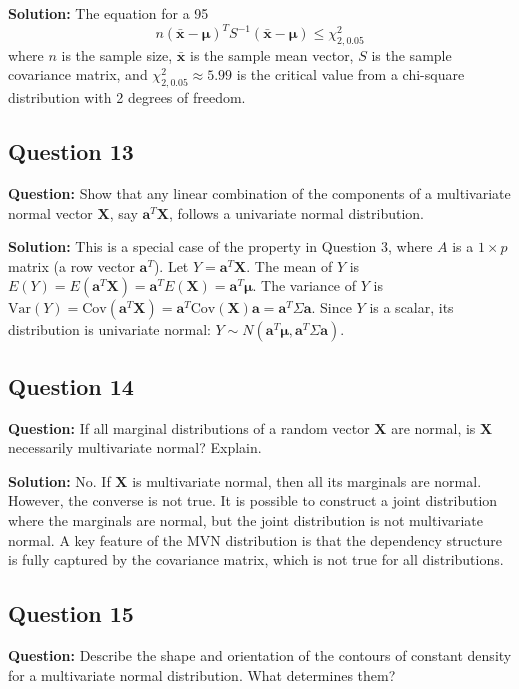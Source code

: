 \textbf{Solution:}
The equation for a 95%
$$ n(\bar{\mathbf{x}} - \boldsymbol{\mu})^T S^{-1} (\bar{\mathbf{x}} - \boldsymbol{\mu}) \le \chi^2_{2, 0.05} $$
where $n$ is the sample size, $\bar{\mathbf{x}}$ is the sample mean vector, $S$ is the sample covariance matrix, and $\chi^2_{2, 0.05} \approx 5.99$ is the critical value from a chi-square distribution with 2 degrees of freedom.

\subsection*{Question 13}
\textbf{Question:} Show that any linear combination of the components of a multivariate normal vector $\mathbf{X}$, say $\mathbf{a}^T\mathbf{X}$, follows a univariate normal distribution.

\textbf{Solution:}
This is a special case of the property in Question 3, where $A$ is a $1 \times p$ matrix (a row vector $\mathbf{a}^T$).
Let $Y = \mathbf{a}^T\mathbf{X}$. The mean of $Y$ is $E(Y) = E(\mathbf{a}^T\mathbf{X}) = \mathbf{a}^T E(\mathbf{X}) = \mathbf{a}^T\boldsymbol{\mu}$.
The variance of $Y$ is $\text{Var}(Y) = \text{Cov}(\mathbf{a}^T\mathbf{X}) = \mathbf{a}^T \text{Cov}(\mathbf{X}) \mathbf{a} = \mathbf{a}^T\Sigma\mathbf{a}$.
Since $Y$ is a scalar, its distribution is univariate normal: $Y \sim N(\mathbf{a}^T\boldsymbol{\mu}, \mathbf{a}^T\Sigma\mathbf{a})$.

\subsection*{Question 14}
\textbf{Question:} If all marginal distributions of a random vector $\mathbf{X}$ are normal, is $\mathbf{X}$ necessarily multivariate normal? Explain.

\textbf{Solution:}
No. If $\mathbf{X}$ is multivariate normal, then all its marginals are normal. However, the converse is not true. It is possible to construct a joint distribution where the marginals are normal, but the joint distribution is not multivariate normal. A key feature of the MVN distribution is that the dependency structure is fully captured by the covariance matrix, which is not true for all distributions.

\subsection*{Question 15}
\textbf{Question:} Describe the shape and orientation of the contours of constant density for a multivariate normal distribution. What determines them?

